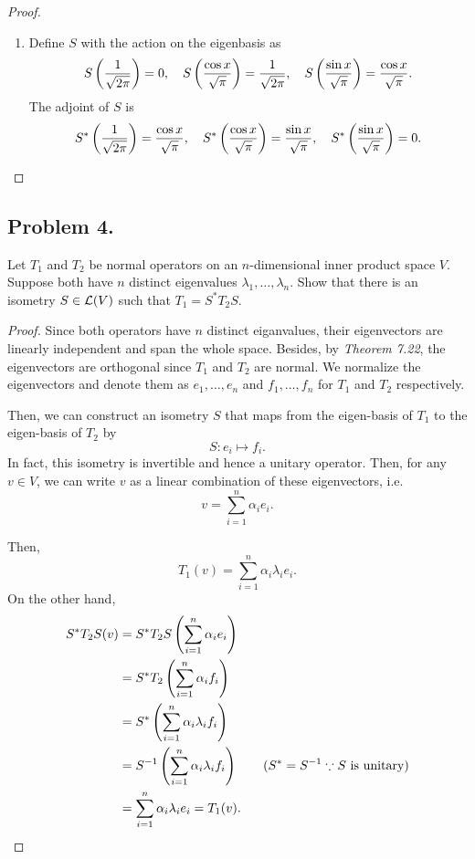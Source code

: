 \documentclass{article}
\begin{document}
\begin{proof}
\begin{enumerate}[label=(\alph*)]
            \item 
            Define $S$ with the action on the eigenbasis as
            \[
                S\left(\frac{1}{\sqrt{2\pi}}\right) = 0, \quad
                S\left(\frac{\cos x}{\sqrt{\pi}}\right) = \frac{1}{\sqrt{2\pi}}, \quad
                S\left(\frac{\sin x}{\sqrt{\pi}}\right) = \frac{\cos x}{\sqrt{\pi}}.
            \]    
            The adjoint of $S$ is
            \[
                S^*\left(\frac{1}{\sqrt{2\pi}}\right) = \frac{\cos x}{\sqrt{\pi}}, \quad
                S^*\left(\frac{\cos x}{\sqrt{\pi}}\right) = \frac{\sin x}{\sqrt{\pi}}, \quad
                S^*\left(\frac{\sin x}{\sqrt{\pi}}\right) = 0.
            \]
    \end{enumerate}    
\end{proof}


\newpage
\subsection*{Problem 4.}
Let $T_1$ and $T_2$ be normal operators on an $n$-dimensional inner product space $V$. 
Suppose both  have $n$ distinct eigenvalues $\lambda_1, \ldots, \lambda_n$. 
Show that there is an isometry $S\in {\cal L}(V)$ such that $T_1=S^*T_2S$. 
\begin{proof}
    Since both operators have $n$ distinct eiganvalues, their eigenvectors are linearly
    independent and span the whole space. Besides, by \emph{Theorem 7.22}, the eigenvectors are 
    orthogonal since $T_1$ and $T_2$ are normal. We normalize the eigenvectors and denote them as
    $e_1,\dots, e_n$ and $f_1,\dots, f_n$ for $T_1$ and $T_2$ respectively. 
    
    Then, we can construct an isometry $S$ that maps from the eigen-basis of $T_1$ to the 
    eigen-basis of $T_2$ by 
    \[
        S:e_i\mapsto f_i.
    \]
    In fact, this isometry is invertible and hence a unitary operator. 
    Then, for any $v\in V$, we can write $v$ as a linear combination of these eigenvectors, i.e.
    \[
        v = \sum_{i=1}^n \alpha_i e_i.
    \]

    Then, 
    \[
      T_1(v) = \sum_{i=1}^n \alpha_i \lambda_i e_i.
    \]
    On the other hand, 
    \begin{align*}
        S^*T_2S(v) & = S^*T_2S\left(\sum_{i=1}^n \alpha_i e_i\right) \\
        & = S^*T_2\left(\sum_{i=1}^n \alpha_i f_i\right) \\
        & = S^*\left(\sum_{i=1}^n \alpha_i \lambda_i f_i\right) \\
        & = S^{-1}\left(\sum_{i=1}^n \alpha_i \lambda_i f_i\right) \qquad (S^* = S^{-1}\because S 
        \text{ is unitary})\\
        & = \sum_{i=1}^n \alpha_i \lambda_i e_i = T_1(v).
    \end{align*}
\end{proof}
\end{document}
